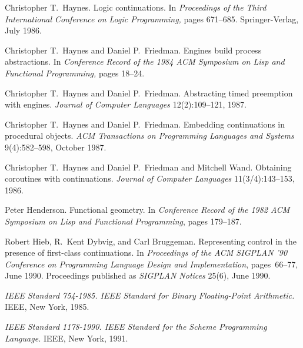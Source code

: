 \begin{thebibliography}{999}
Christopher T.~Haynes.
Logic continuations. 
In {\em Proceedings of the Third International Conference on
  Logic Programming,\/} pages 671--685.
Springer-Verlag, July 1986.

Christopher T.~Haynes and Daniel P.~Friedman.
Engines build process abstractions.
In {\em Conference Record of the 1984 ACM Symposium on Lisp and
  Functional Programming,\/} pages 18--24.


Christopher T.~Haynes and Daniel P.~Friedman.
Abstracting timed preemption with engines.
{\em Journal of Computer Languages} 12(2):109--121, 1987.

Christopher T.~Haynes and Daniel P.~Friedman.
Embedding continuations in procedural objects.
{\em ACM Transactions on Programming Languages and Systems} 9(4):582--598,
  October 1987.



Christopher T.~Haynes and Daniel P.~Friedman and Mitchell Wand.
Obtaining coroutines with continuations.
{\em Journal of Computer Languages} 11(3/4):143--153, 1986.

Peter Henderson.
Functional geometry.
In {\em Conference Record of the 1982 ACM Symposium on Lisp and
  Functional Programming}, pages 179--187.

Robert Hieb, R.~Kent Dybvig, and Carl Bruggeman.
Representing control in the presence of first-class continuations.
In {\em Proceedings of the ACM SIGPLAN '90 Conference on Programming
  Language Design and Implementation},
pages~66--77, June 1990.
Proceedings published as {\em SIGPLAN Notices} 25(6), June 1990.

{\em IEEE Standard 754-1985.  IEEE Standard for Binary Floating-Point
Arithmetic.}  IEEE, New York, 1985.

{\em IEEE Standard 1178-1990.  IEEE Standard for the Scheme
  Programming Language.}  IEEE, New York, 1991.


\end{thebibliography}
